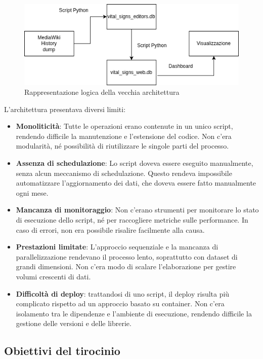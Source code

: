 \begin{figure}[htbp]
    \centering
    \includegraphics[width=\linewidth]{img/oldarch.png}
    \caption{Rappresentazione logica della vecchia architettura}
    \label{fig:oldarch}
\end{figure}
L'architettura presentava diversi limiti:
\begin{itemize}
    \item \textbf{Monoliticità}: Tutte le operazioni erano contenute in un unico script, rendendo difficile la manutenzione e l'estensione del codice. Non c'era modularità, né possibilità di riutilizzare le singole parti del processo.
    \item \textbf{Assenza di schedulazione}: Lo script doveva essere eseguito manualmente, senza alcun meccanismo di schedulazione. Questo rendeva impossibile automatizzare l'aggiornamento dei dati, che doveva essere fatto manualmente ogni mese.
    \item \textbf{Mancanza di monitoraggio}: Non c'erano strumenti per monitorare lo stato di esecuzione dello script, né per raccogliere metriche sulle performance. In caso di errori, non era possibile risalire facilmente alla causa.
    \item \textbf{Prestazioni limitate}: L'approccio sequenziale e la mancanza di parallelizzazione rendevano il processo lento, soprattutto con dataset di grandi dimensioni. Non c'era modo di scalare l'elaborazione per gestire volumi crescenti di dati.
    \item \textbf{Difficoltà di deploy}: trattandosi di uno script, il deploy risulta più complicato rispetto ad un approccio basato su container. Non c'era isolamento tra le dipendenze e l'ambiente di esecuzione, rendendo difficile la gestione delle versioni e delle librerie.
\end{itemize}

\subsection{Obiettivi del tirocinio}
\label{subsec:obiettivi_tirocinio}

